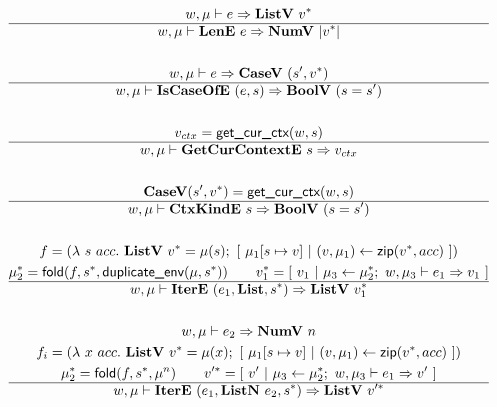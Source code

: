 \begin{gather*}
  w, \mu \vdash e \Rightarrow \listv ~ \seq{v} \\
  \hline
  w, \mu \vdash \lene ~ e \Rightarrow \numv ~ |\seq v| \\
%
\newline \\
  w, \mu \vdash e \Rightarrow \casev ~ (s', \seq{v}) \\
  \hline
  w, \mu \vdash \iscaseofe ~ (e, s) \Rightarrow \boolv ~ (s = s') \\
%
\newline \\
  v_{ctx} = \getcurctx(w, s) \\
  \hline
  w, \mu \vdash \getcurctxe ~ s \Rightarrow v_{ctx} \\
%
\newline \\
  \casev (s', \seq v) = \getcurctx(w, s) \\
  \hline
  w, \mu \vdash \ctxkinde ~ s \Rightarrow \boolv ~ (s = s') \\
%
\newline \\
  f =
    (\lambda ~ s ~ acc. ~
      \listv ~ \seq v = \mu(s); ~
      [ ~ \mu_1[s \mapsto v] ~ | ~ (v, \mu_1) \leftarrow \zip (\seq v, acc) ~ ]
    )
  \\
  \seq{\mu_2} = \fold(f, \seq{s}, \duplicateenv(\mu, \seq{s})) \qquad
  \seq{v_1} =
    [ ~
      v_1
    ~ | ~
      \mu_3 \leftarrow \seq {\mu_2}; ~ w, \mu_3 \vdash e_1 \Rightarrow v_1
    ~ ] \\
  \hline
  w, \mu \vdash \itere ~ (e_1, \listiter, \seq{s}) \Rightarrow \listv ~ \seq{v_1} \\
%
\newline \\
  w, \mu \vdash e_2 \Rightarrow \numv ~ n \\
  f_i =
    (\lambda ~ x ~ acc. ~
      \listv ~ \seq v = \mu(x); ~
      [ ~ \mu_1[s \mapsto v] ~ | ~ (v, \mu_1) \leftarrow \zip (\seq v, acc) ~ ]
    )
  \\
  \seq{\mu_2} = \fold(f, \seq{s}, \mu^n) \qquad
  \seq{v'} =
    [ ~
      v'
    ~ | ~
      \mu_3 \leftarrow \seq {\mu_2}; ~ w, \mu_3 \vdash e_1 \Rightarrow v'
    ~ ] \\
  \hline
  w, \mu \vdash \itere ~ (e_1, \listniter ~ e_2, \seq{s}) \Rightarrow \listv ~ \seq{v'} \\
%
\newline \\

\end{gather*}
